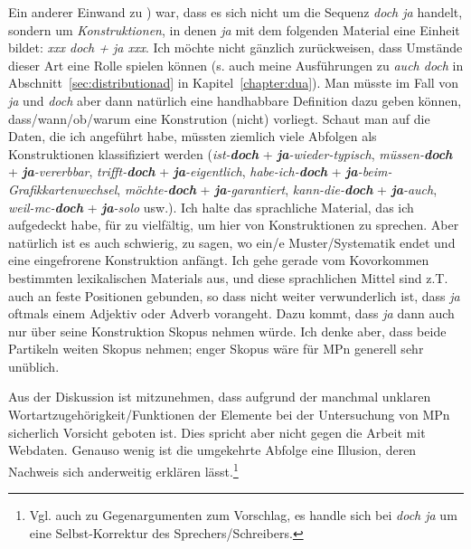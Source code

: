 Ein anderer Einwand zu \citet{Mueller2017b}) war, dass es sich nicht um die Sequenz \textit{doch ja} handelt, sondern  um \textit{Konstruktionen}, in denen \textit{ja} mit dem folgenden Material eine Einheit bildet: \textit{xxx doch + ja xxx}. Ich möchte nicht gänz\-lich zurückweisen, dass Umstände dieser Art eine Rolle spielen können (s. auch meine Ausführungen zu \textit{auch doch} in Abschnitt~\ref{sec:distributionad} in Kapitel~\ref{chapter:dua}). Man müsste im Fall von \textit{ja} und \textit{doch} aber dann natürlich eine handhabbare Definition dazu geben können, dass/wann/ob/warum eine Konstrution (nicht) vorliegt. Schaut man auf die Daten, die ich angeführt habe, müssten ziemlich viele Abfolgen als Konstruktionen klassifiziert werden (\textit{ist-\textbf{doch}} + \textit{\textbf{ja}-wieder-typisch}, \textit{müssen-\textbf{doch}} + \textit{\textbf{ja}-vererbbar}, \textit{trifft-\textbf{doch}} + \textit{\textbf{ja}-eigentlich}, \textit{habe-ich-\textbf{doch}} + \textit{\textbf{ja}-beim-Grafikkartenwech\-sel}, \textit{möchte-\textbf{doch}} + \textit{\textbf{ja}-garantiert}, \textit{kann-die-\textbf{doch}} + \textit{\textbf{ja}-auch}, \textit{weil-mc-\textbf{doch}} + \textit{\textbf{ja}-solo} usw.). Ich halte das sprachliche Material, das ich aufgedeckt habe, für zu vielfältig, um hier von Konstruktionen zu sprechen. Aber natürlich ist es auch schwierig, zu sagen, wo ein/e Muster/Systematik endet und eine eingefrorene Konstruktion anfängt. Ich gehe gerade vom Kovorkommen bestimmten lexikali\-schen Materials aus, und diese sprachlichen Mittel sind z.T. auch an feste Positionen gebunden, so dass nicht weiter verwunderlich ist, dass \textit{ja} oftmals einem Adjektiv oder Adverb vorangeht. Dazu kommt, dass \textit{ja} dann auch nur über seine Konstruktion Skopus nehmen würde. Ich denke aber, dass beide Partikeln weiten Skopus  nehmen; enger Skopus wäre für MPn generell sehr unüblich.

Aus der Diskussion ist mitzunehmen, dass aufgrund der manchmal unklaren Wortartzugehörigkeit/Funktionen der Elemente bei der Untersuchung von MPn sicherlich Vorsicht geboten ist. Dies spricht aber nicht gegen die Arbeit mit Webdaten. Genauso wenig ist die umgekehrte Abfolge eine Illusion, deren Nachweis sich anderweitig erklären lässt.\footnote{Vgl. auch \citet[232]{Mueller2017b} zu Gegenargumenten zum Vorschlag, es handle sich bei \textit{doch ja} um eine Selbst-Korrektur des Sprechers/Schreibers.}

